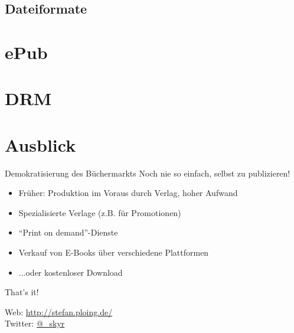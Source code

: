 \documentclass[hyperref={pdfpagelabels=false}]{beamer}
\begin{document}



\subsection{Dateiformate}




\section{ePub}




\section{DRM}





\section{Ausblick}





\begin{frame}{Demokratisierung des Büchermarkts}
	Noch nie so einfach, selbst zu publizieren!
	\begin{itemize}
		\item Früher: Produktion im Voraus durch Verlag, hoher Aufwand
		\item<2-> Spezialisierte Verlage (z.B. für Promotionen)
		\item<3-> "`Print on demand"'-Dienste
		\item<4-> Verkauf von E-Books über verschiedene Plattformen
		\item<4-> ...oder kostenloser Download
	\end{itemize}
\end{frame}


\begin{frame}[plain]
	That's it!
	\begin{center}
	\end{center}
	\begin{center}
		Web: \url{http://stefan.ploing.de/} \\
		Twitter: \href{https://twitter.com/\_skyr}{@\_skyr}
	\end{center}
\end{frame}


\end{document}
